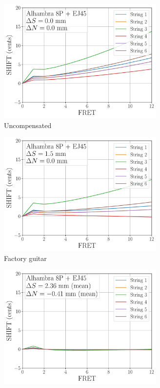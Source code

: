  \begin{figure}
  \centering
  \begin{subfigure}[b]{0.45\textwidth}
   \centering
   \includegraphics[width=3.25in]{figures/shift_alhambra8p_ej45_null}
   \caption{Uncompensated}
   \label{fig:shift_alhambra8p_ej45_null}
  \end{subfigure}
  \hspace{0.25in}
  \begin{subfigure}[b]{0.45\textwidth}
   \centering
   \includegraphics[width=3.25in]{figures/shift_alhambra8p_ej45_factory}
   \caption{Factory guitar}
   \label{fig:shift_alhambra8p_ej45_factory}
  \end{subfigure}
  \par\vspace{0.25in}
  \begin{subfigure}[b]{0.45\textwidth}
   \centering
   \includegraphics[width=3.25in]{figures/shift_alhambra8p_ej45_full}

\end{subfigure}
\end{figure}
